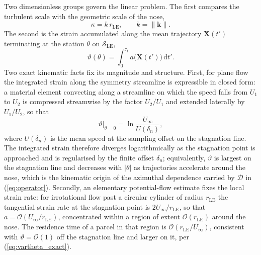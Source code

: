 \documentclass[lineno]{JFM-FLM_Au}
\begin{document}
Two dimensionless groups govern the linear problem. The first compares the
turbulent scale with the geometric scale of the nose,
\begin{equation}
  \kappa = k\,r_{\mathrm{LE}},
  \qquad k = \|\boldsymbol{k}\|.
  \label{eq:kappa}
\end{equation}
The second is the strain accumulated along the mean trajectory
$\boldsymbol{X}(t')$ terminating at the station $\theta$ on
$\mathcal{S}_{\mathrm{LE}}$,
\begin{equation}
  \vartheta(\theta)
  = \int_{0}^{\tau_{\mathrm{t}}}
    a\big(\boldsymbol{X}(t')\big)\,\mathrm{d}t'.
  \label{eq:vartheta}
\end{equation}
Two exact kinematic facts fix its magnitude and structure. First, for
plane flow the integrated strain along the symmetry streamline is
expressible in closed form: a material element convecting along a
streamline on which the speed falls from $U_1$ to $U_2$ is compressed
streamwise by the factor $U_2/U_1$ and extended laterally by $U_1/U_2$, so
that
\begin{equation}
  \vartheta\big|_{\theta=0}
  = \ln\!\frac{U_\infty}{U(\delta_n)},
  \label{eq:vartheta_exact}
\end{equation}
where $U(\delta_n)$ is the mean speed at the sampling offset on the
stagnation line. The integrated strain therefore diverges logarithmically
as the stagnation point is approached and is regularised by the finite
offset $\delta_n$; equivalently, $\vartheta$ is largest on the stagnation
line and decreases with $|\theta|$ as trajectories accelerate around the
nose, which is the kinematic origin of the azimuthal dependence carried by
$\mathcal{D}$ in (\ref{eq:operator}). Secondly, an elementary
potential-flow estimate fixes the local strain rate: for irrotational flow
past a circular cylinder of radius $r_{\mathrm{LE}}$ the tangential strain
rate at the stagnation point is $2U_\infty/r_{\mathrm{LE}}$, so that
$a = \mathcal{O}(U_\infty/r_{\mathrm{LE}})$, concentrated within a region
of extent $\mathcal{O}(r_{\mathrm{LE}})$ around the nose. The residence
time of a parcel in that region is
$\mathcal{O}(r_{\mathrm{LE}}/U_\infty)$, consistent with
$\vartheta = \mathcal{O}(1)$ off the stagnation line and larger on it,
per (\ref{eq:vartheta_exact}).
\end{document}
